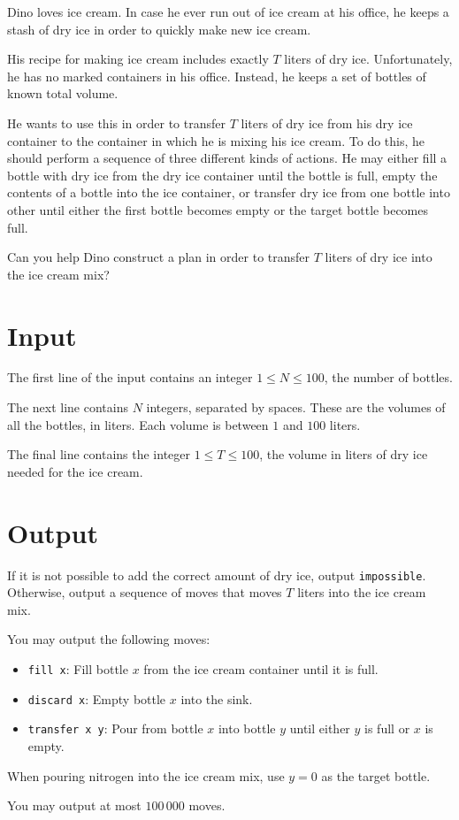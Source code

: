 Dino loves ice cream. 
In case he ever run out of ice cream at his office, he keeps a stash of dry ice in order to quickly make new ice cream.

His recipe for making ice cream includes exactly $T$ liters of dry ice.
Unfortunately, he has no marked containers in his office.
Instead, he keeps a set of bottles of known total volume.

He wants to use this in order to transfer $T$ liters of dry ice from his dry ice container to the container in which he is mixing his ice cream.
To do this, he should perform a sequence of three different kinds of actions.
He may either fill a bottle with dry ice from the dry ice container until the bottle is full, empty the contents of a bottle into the ice container, or transfer dry ice from one bottle into other until either the first bottle becomes empty or the target bottle becomes full.

Can you help Dino construct a plan in order to transfer $T$ liters of dry ice into the ice cream mix?

\section{Input}
The first line of the input contains an integer $1 \le N \le 100$, the number of bottles.

The next line contains $N$ integers, separated by spaces.
These are the volumes of all the bottles, in liters.
Each volume is between $1$ and $100$ liters.

The final line contains the integer $1 \le T \le 100$, the volume in liters of dry ice needed for the ice cream.

\section{Output}
If it is not possible to add the correct amount of dry ice, output \texttt{impossible}.
Otherwise, output a sequence of moves that moves $T$ liters into the ice cream mix.

You may output the following moves:
\begin{itemize}
\item \texttt{fill x}: Fill bottle $x$ from the ice cream container until it is full.
\item \texttt{discard x}: Empty bottle $x$ into the sink.
\item \texttt{transfer x y}: Pour from bottle $x$ into bottle $y$ until either $y$ is full or $x$ is empty.
\end{itemize}

When pouring nitrogen into the ice cream mix, use $y = 0$ as the target bottle.

You may output at most $100\,000$ moves.
